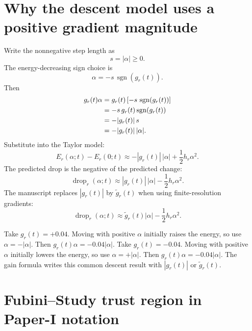 \documentclass[10pt,twocolumn]{article}
\newcommand{\sgn}{\operatorname{sgn}}
\begin{document}
\section{Why the descent model uses a positive gradient magnitude}

Write the nonnegative step length as
\begin{equation}
s=|\alpha|\ge0.
\label{eq:s_abs_alpha}
\end{equation}
The energy-decreasing sign choice is
\begin{equation}
\alpha=-s\,\sgn(g_r(t)).
\label{eq:alpha_descent_sign}
\end{equation}
Then
\begin{align}
g_r(t)\alpha
&=g_r(t)\left[-s\,\sgn(g_r(t))\right]\notag\\
&=-s\,g_r(t)\sgn(g_r(t))\notag\\
&=-|g_r(t)|\,s\notag\\
&=-|g_r(t)|\,|\alpha|.
\label{eq:linear_term_sign}
\end{align}
Substitute into the Taylor model:
\begin{equation}
E_r(\alpha;t)-E_r(0;t)
\approx
-|g_r(t)|\,|\alpha|
+\frac12h_r\alpha^2.
\label{eq:descent_taylor}
\end{equation}
The predicted drop is the negative of the predicted change:
\begin{equation}
\operatorname{drop}_r(\alpha;t)
\approx
|g_r(t)|\,|\alpha|-\frac12h_r\alpha^2.
\label{eq:drop_raw_gradient}
\end{equation}
The manuscript replaces \(|g_r(t)|\) by \(\widetilde g_r(t)\) when using finite-resolution gradients:
\begin{equation}
\operatorname{drop}_r(\alpha;t)
\approx
\widetilde g_r(t)|\alpha|-\frac12h_r\alpha^2.
\label{eq:drop_resolved_gradient}
\end{equation}

\begin{examplebox}
Take \(g_r(t)=+0.04\). Moving with positive \(\alpha\) initially raises the energy, so use \(\alpha=-|\alpha|\). Then \(g_r(t)\alpha=-0.04|\alpha|\). Take \(g_r(t)=-0.04\). Moving with positive \(\alpha\) initially lowers the energy, so use \(\alpha=+|\alpha|\). Then \(g_r(t)\alpha=-0.04|\alpha|\). The gain formula writes this common descent result with \(|g_r(t)|\) or \(\widetilde g_r(t)\).
\end{examplebox}

\section{Fubini--Study trust region in Paper-I notation}
\end{document}
